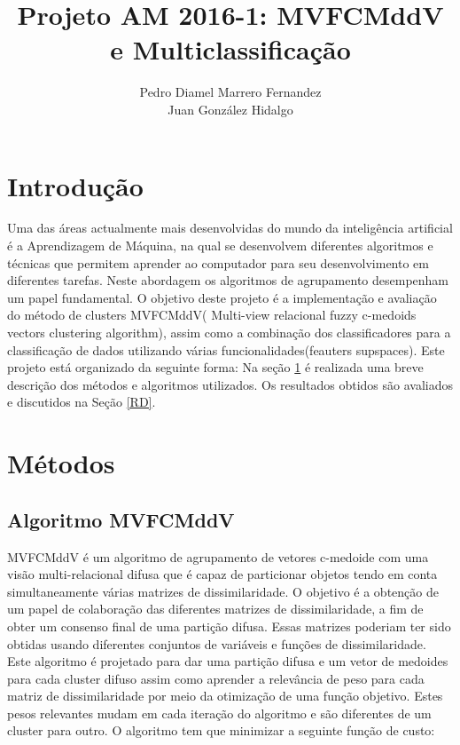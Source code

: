 \documentclass[12pt]{article}
\author{Pedro Diamel Marrero Fernandez \\ Juan González Hidalgo}
\title{Projeto AM 2016-1: MVFCMddV e Multiclassificação}
\begin{document}
\maketitle



\section*{Introdução}

Uma das áreas actualmente mais desenvolvidas do mundo da inteligência artificial é a Aprendizagem de Máquina, na qual se desenvolvem diferentes algoritmos e técnicas que permitem aprender ao computador para seu desenvolvimento em diferentes tarefas. Neste abordagem os algoritmos de agrupamento desempenham um papel fundamental. O objetivo deste projeto é a implementação e avaliação do método de clusters MVFCMddV( Multi-view relacional fuzzy c-medoids vectors clustering algorithm), assim como a combinação dos classificadores para a classificação de dados utilizando várias funcionalidades(feauters supspaces). Este projeto está organizado da seguinte forma: Na seção \ref{MET} é realizada uma breve descrição dos métodos e algoritmos utilizados. Os resultados obtidos são avaliados e discutidos na Seção \ref{RD}.

\section{Métodos}\label{MET}

\subsection{Algoritmo MVFCMddV}

MVFCMddV é um algoritmo de agrupamento de vetores c-medoide com uma visão multi-relacional difusa que é capaz de particionar objetos tendo em conta simultaneamente várias matrizes de dissimilaridade. O objetivo é a obtenção de um papel de colaboração das diferentes matrizes de dissimilaridade, a fim de obter um consenso final de uma partição difusa.
Essas matrizes poderiam ter sido obtidas usando diferentes conjuntos de variáveis e funções de dissimilaridade. Este algoritmo é projetado para dar uma partição difusa e um vetor de medoides para cada cluster difuso assim como aprender a relevância de peso para cada matriz de dissimilaridade por meio da otimização de uma função objetivo. Estes pesos relevantes mudam em cada iteração do algoritmo e são diferentes de um cluster para outro. O algoritmo tem que minimizar a seguinte função de custo:
 
\end{document}
